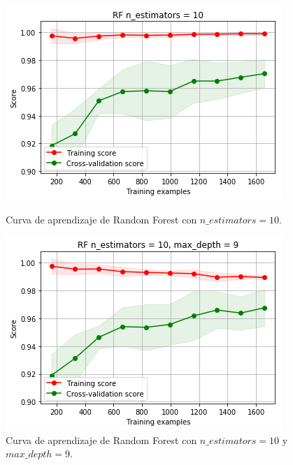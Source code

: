 \documentclass[11pt,a4paper]{article}
\begin{document}
\begin{figure}[H]
\centering
\begin{minipage}{.5\textwidth}
    \centering
    \includegraphics[scale=0.4]{img/lc-rf-n-10.png}
    \caption{Curva de aprendizaje de Random Forest con $n\_estimators=10$.}
    \label{fig:lc-rf-n-10}
\end{minipage}%
\begin{minipage}{.5\textwidth}
    \centering
    \includegraphics[scale=0.4]{img/lc-rf-n-10-d-9.png}
    \caption{Curva de aprendizaje de Random Forest con $n\_estimators=10$ y $max\_depth=9$.}
    \label{fig:lc-rf-n-10-d-9}
\end{minipage}
\end{figure}
\end{document}
